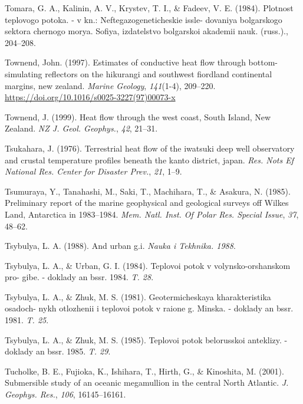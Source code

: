 \documentclass[draft,linenumbers]{agujournal2018}
\begin{document}
\leavevmode{}%
Tomara, G. A., Kalinin, A. V., Krystev, T. I., \& Fadeev, V. E. (1984).
Plotnost teplovogo potoka. - v kn.: Neftegazogeneticheskie issle-
dovaniya bolgarskogo sektora chernogo morya. Sofiya, izdatelstvo
bolgarskoi akademii nauk. (russ.)., 204--208.

\leavevmode{}%
Townend, John. (1997). Estimates of conductive heat flow through
bottom-simulating reflectors on the hikurangi and southwest fiordland
continental margins, new zealand. \emph{Marine Geology},
\emph{141}(1-4), 209--220.
\url{https://doi.org/10.1016/s0025-3227(97)00073-x}

\leavevmode{}%
Townend, J. (1999). Heat flow through the west coast, {South Island, New
Zealand}. \emph{NZ J. Geol. Geophys.}, \emph{42}, 21--31.

\leavevmode{}%
Tsukahara, J. (1976). Terrestrial heat flow of the iwatsuki deep well
observatory and crustal temperature profiles beneath the kanto district,
japan. \emph{Res. Nots Ef National Res. Center for Disaster Prev.},
\emph{21}, 1--9.

\leavevmode{}%
Tsumuraya, Y., Tanahashi, M., Saki, T., Machihara, T., \& Asakura, N.
(1985). Preliminary report of the marine geophysical and geological
surveys off {Wilkes Land, Antarctica} in 1983--1984. \emph{Mem. Natl.
Inst. Of Polar Res. Special Issue}, \emph{37}, 48--62.

\leavevmode{}%
Tsybulya, L. A. (1988). And urban g.i. \emph{Nauka i Tekhnika. 1988}.

\leavevmode{}%
Tsybulya, L. A., \& Urban, G. I. (1984). Teplovoi potok v
volynsko-orshanskom pro- gibe. - doklady an bssr. 1984. \emph{T. 28}.

\leavevmode{}%
Tsybulya, L. A., \& Zhuk, M. S. (1981). Geotermicheskaya kharakteristika
osadoch- nykh otlozhenii i teplovoi potok v raione g. Minska. - doklady
an bssr. 1981. \emph{T. 25}.

\leavevmode{}%
Tsybulya, L. A., \& Zhuk, M. S. (1985). Teplovoi potok belorusskoi
anteklizy. - doklady an bssr. 1985. \emph{T. 29}.

\leavevmode{}%
Tucholke, B. E., Fujioka, K., Ishihara, T., Hirth, G., \& Kinoshita, M.
(2001). Submersible study of an oceanic megamullion in the central
{North Atlantic}. \emph{J. Geophys. Res.}, \emph{106}, 16145--16161.
\end{document}

